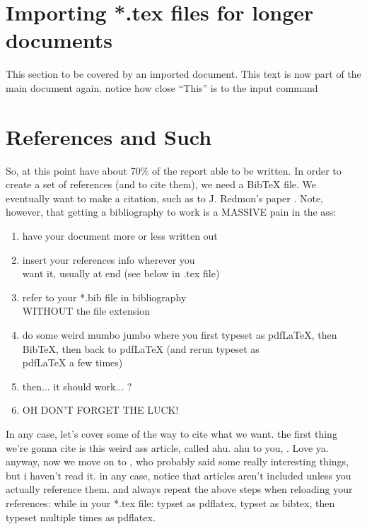 \section{Importing *.tex files for longer documents} \label{sect_teximporting}
This section to be covered by an imported document.
This text is now part of the main document again. notice how close ``This'' is to the input command

\section{References and Such} \label {sect_references}
So, at this point have about 70\% of the report able to be written. In order to create a set of references (and to cite them), we need a BibTeX file. We eventually want to make a citation, such as to J. Redmon's paper \cite{red16}. Note, however, that getting a bibliography to work is a MASSIVE pain in the ass:
\begin{enumerate}
\itemsep=-0.5em %
\item have your document more or less written out
\item insert your references info wherever you \\want it, usually at end (see below in .tex file)
\item refer to your *.bib file in bibliography \\WITHOUT the file extension
\item do some weird mumbo jumbo where you first typeset as  pdfLaTeX, then BibTeX, then back to pdfLaTeX (and rerun typeset as\\  pdfLaTeX a few times)
\item then... it should work... ?
\item OH DON'T FORGET THE LUCK!
\end{enumerate}


In any case, let's cover some of the way to cite what we want. the first thing we're gonna cite is this weird ass article, called ahu. ahu to you, \cite{ahu61}. Love ya. anyway, now we move on  to \cite{ab94}, who probably said some really interesting things, but i haven't read it. in any case, notice that articles aren't included unless you actually reference them. and always repeat the above steps when reloading your references: while in your *.tex file: typset as pdflatex, typset as bibtex, then typeset multiple times as pdflatex. 

